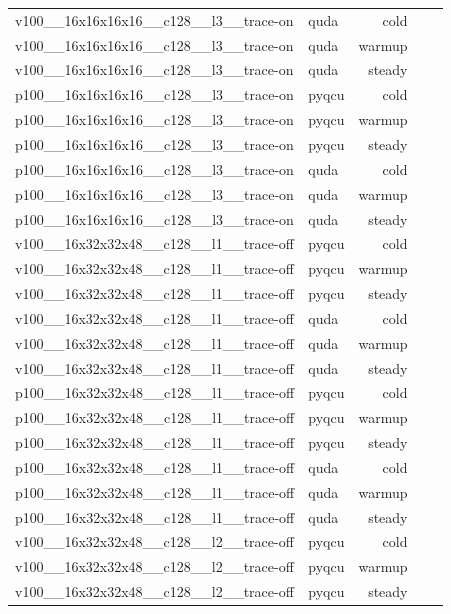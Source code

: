 \begin{table}[htbp]
\begin{tabular}{@{}llrrr@{}}
v100\_\_16x16x16x16\_\_c128\_\_l3\_\_trace-on & quda & cold &  &  \\
v100\_\_16x16x16x16\_\_c128\_\_l3\_\_trace-on & quda & warmup &  &  \\
v100\_\_16x16x16x16\_\_c128\_\_l3\_\_trace-on & quda & steady &  &  \\
p100\_\_16x16x16x16\_\_c128\_\_l3\_\_trace-on & pyqcu & cold &  &  \\
p100\_\_16x16x16x16\_\_c128\_\_l3\_\_trace-on & pyqcu & warmup &  &  \\
p100\_\_16x16x16x16\_\_c128\_\_l3\_\_trace-on & pyqcu & steady &  &  \\
p100\_\_16x16x16x16\_\_c128\_\_l3\_\_trace-on & quda & cold &  &  \\
p100\_\_16x16x16x16\_\_c128\_\_l3\_\_trace-on & quda & warmup &  &  \\
p100\_\_16x16x16x16\_\_c128\_\_l3\_\_trace-on & quda & steady &  &  \\
v100\_\_16x32x32x48\_\_c128\_\_l1\_\_trace-off & pyqcu & cold &  &  \\
v100\_\_16x32x32x48\_\_c128\_\_l1\_\_trace-off & pyqcu & warmup &  &  \\
v100\_\_16x32x32x48\_\_c128\_\_l1\_\_trace-off & pyqcu & steady &  &  \\
v100\_\_16x32x32x48\_\_c128\_\_l1\_\_trace-off & quda & cold &  &  \\
v100\_\_16x32x32x48\_\_c128\_\_l1\_\_trace-off & quda & warmup &  &  \\
v100\_\_16x32x32x48\_\_c128\_\_l1\_\_trace-off & quda & steady &  &  \\
p100\_\_16x32x32x48\_\_c128\_\_l1\_\_trace-off & pyqcu & cold &  &  \\
p100\_\_16x32x32x48\_\_c128\_\_l1\_\_trace-off & pyqcu & warmup &  &  \\
p100\_\_16x32x32x48\_\_c128\_\_l1\_\_trace-off & pyqcu & steady &  &  \\
p100\_\_16x32x32x48\_\_c128\_\_l1\_\_trace-off & quda & cold &  &  \\
p100\_\_16x32x32x48\_\_c128\_\_l1\_\_trace-off & quda & warmup &  &  \\
p100\_\_16x32x32x48\_\_c128\_\_l1\_\_trace-off & quda & steady &  &  \\
v100\_\_16x32x32x48\_\_c128\_\_l2\_\_trace-off & pyqcu & cold &  &  \\
v100\_\_16x32x32x48\_\_c128\_\_l2\_\_trace-off & pyqcu & warmup &  &  \\
v100\_\_16x32x32x48\_\_c128\_\_l2\_\_trace-off & pyqcu & steady &  &  \\

\end{tabular}
\end{table}
